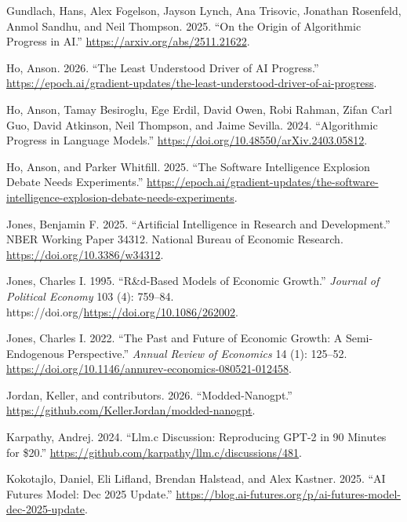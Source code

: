 \documentclass[
  11pt,
  letterpaper,
  DIV=11,
  numbers=noendperiod]{scrartcl}
\newlength{\cslhangindent}
\newenvironment{CSLReferences}[2] %
 {\begin{list}{}{%
  \setlength{\itemindent}{0pt}
  \setlength{\leftmargin}{0pt}
  \setlength{\parsep}{0pt}
  \ifodd #1
   \setlength{\leftmargin}{\cslhangindent}
   \setlength{\itemindent}{-1\cslhangindent}
  \fi
  \setlength{\itemsep}{#2\baselineskip}}}
 {\end{list}}
\begin{document}
\begin{CSLReferences}{1}{0}
Gundlach, Hans, Alex Fogelson, Jayson Lynch, Ana Trisovic, Jonathan
Rosenfeld, Anmol Sandhu, and Neil Thompson. 2025. {``On the Origin of
Algorithmic Progress in AI.''} \url{https://arxiv.org/abs/2511.21622}.

Ho, Anson. 2026. {``The Least Understood Driver of AI Progress.''}
\url{https://epoch.ai/gradient-updates/the-least-understood-driver-of-ai-progress}.

Ho, Anson, Tamay Besiroglu, Ege Erdil, David Owen, Robi Rahman, Zifan
Carl Guo, David Atkinson, Neil Thompson, and Jaime Sevilla. 2024.
{``Algorithmic Progress in Language Models.''}
\url{https://doi.org/10.48550/arXiv.2403.05812}.

Ho, Anson, and Parker Whitfill. 2025. {``The Software Intelligence
Explosion Debate Needs Experiments.''}
\url{https://epoch.ai/gradient-updates/the-software-intelligence-explosion-debate-needs-experiments}.

Jones, Benjamin F. 2025. {``Artificial Intelligence in Research and
Development.''} NBER Working Paper 34312. National Bureau of Economic
Research. \url{https://doi.org/10.3386/w34312}.

Jones, Charles I. 1995. {``R\&d-Based Models of Economic Growth.''}
\emph{Journal of Political Economy} 103 (4): 759--84.
https://doi.org/\url{https://doi.org/10.1086/262002}.

Jones, Charles I. 2022. {``The Past and Future of Economic Growth: A
Semi-Endogenous Perspective.''} \emph{Annual Review of Economics} 14
(1): 125--52.
\url{https://doi.org/10.1146/annurev-economics-080521-012458}.

Jordan, Keller, and contributors. 2026. {``Modded-Nanogpt.''}
\url{https://github.com/KellerJordan/modded-nanogpt}.

Karpathy, Andrej. 2024. {``Llm.c Discussion: Reproducing {GPT}-2 in 90
Minutes for \$20.''}
\url{https://github.com/karpathy/llm.c/discussions/481}.

Kokotajlo, Daniel, Eli Lifland, Brendan Halstead, and Alex Kastner.
2025. {``AI Futures Model: Dec 2025 Update.''}
\url{https://blog.ai-futures.org/p/ai-futures-model-dec-2025-update}.


\end{CSLReferences}
\end{document}
